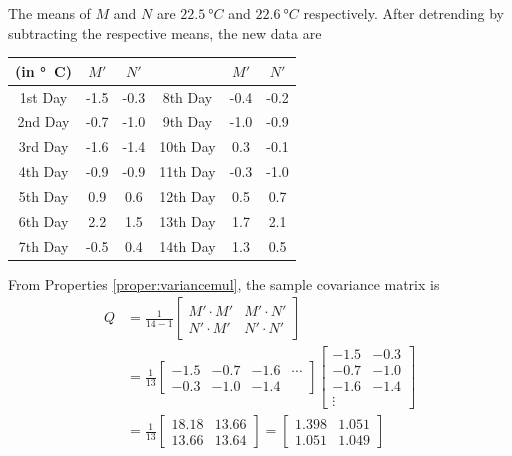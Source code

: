 \begin{solution}
The means of $M$ and $N$ are $\SI{22.5}{\degree C}$ and $\SI{22.6}{\degree C}$ respectively. After detrending by subtracting the respective means, the new data are
\begin{center}
\begin{tabular}{|c|c|c|c|c|c|}
\hline
(in \si{\degree C}) & $M'$ & $N'$ & & $M'$ & $N'$ \\
\hline
1st Day & -1.5 & -0.3 & 8th Day & -0.4 & -0.2 \\
\hline
2nd Day & -0.7 & -1.0 & 9th Day & -1.0 & -0.9 \\
\hline
3rd Day & -1.6 & -1.4 & 10th Day & 0.3 & -0.1 \\
\hline
4th Day & -0.9 & -0.9 & 11th Day & -0.3 & -1.0 \\
\hline
5th Day & 0.9 & 0.6 & 12th Day & 0.5 & 0.7 \\
\hline 
6th Day & 2.2 & 1.5 & 13th Day & 1.7 & 2.1 \\
\hline 
7th Day & -0.5 & 0.4 & 14th Day & 1.3 & 0.5 \\
\hline
\end{tabular}
\end{center}
From Properties \ref{proper:variancemul}, the sample covariance matrix is
\begin{align*}
Q &= 
\frac{1}{14-1}
\begin{bmatrix}
M' \cdot M' & M' \cdot N' \\
N' \cdot M' & N' \cdot N' 
\end{bmatrix} \\
&= \frac{1}{13}
\begin{bmatrix}
-1.5 & -0.7 & -1.6 & \cdots \\
-0.3 & -1.0 & -1.4 
\end{bmatrix}
\begin{bmatrix}
-1.5 & -0.3 \\
-0.7 & -1.0 \\
-1.6 & -1.4 \\
\vdots
\end{bmatrix} \\
&= \frac{1}{13}
\begin{bmatrix}
18.18 & 13.66 \\
13.66 & 13.64
\end{bmatrix} = 
\begin{bmatrix}
1.398 & 1.051 \\
1.051 & 1.049
\end{bmatrix}
\end{align*}

\end{solution}
